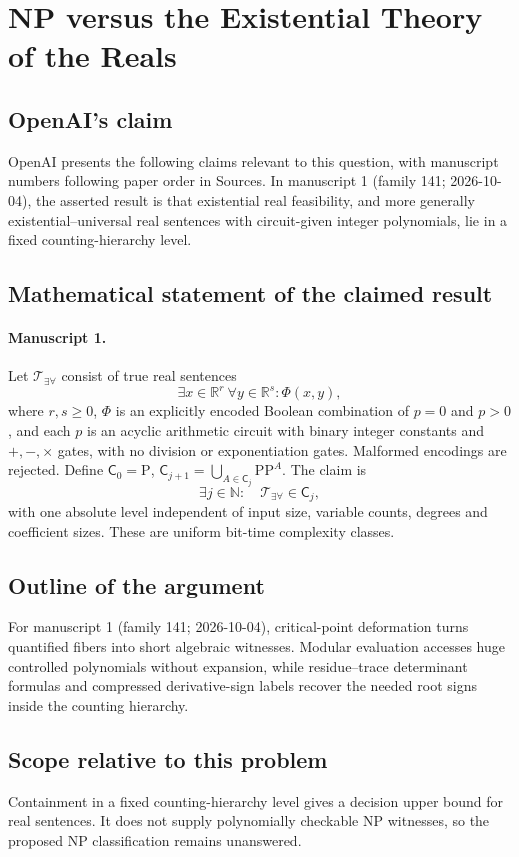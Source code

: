 \documentclass[11pt]{article}
\begin{document}
\section*{NP versus the Existential Theory of the Reals}

\subsection{OpenAI's claim}
OpenAI presents the following claims relevant to this question, with manuscript numbers following paper order in Sources. In manuscript 1 (family 141; 2026-10-04), the asserted result is that existential real feasibility, and more generally existential--universal real sentences with circuit-given integer polynomials, lie in a fixed counting-hierarchy level.

\subsection{Mathematical statement of the claimed result}
\paragraph{Manuscript 1.}
Let $\mathcal T_{\exists\forall}$ consist of true real sentences
\[
 \exists x\in\mathbb R^r\ \forall y\in\mathbb R^s:\Phi(x,y),
\]
where $r,s\ge0$, $\Phi$ is an explicitly encoded Boolean combination of $p=0$ and $p>0$, and each $p$ is an acyclic arithmetic circuit with binary integer constants and $+,-,\times$ gates, with no division or exponentiation gates. Malformed encodings are rejected. Define $\mathsf C_0=\mathrm P$, $\mathsf C_{j+1}=\bigcup_{A\in\mathsf C_j}\mathrm{PP}^A$. The claim is
\[
 \exists j\in\mathbb N:\quad\mathcal T_{\exists\forall}\in\mathsf C_j,
\]
with one absolute level independent of input size, variable counts, degrees and coefficient sizes. These are uniform bit-time complexity classes.

\subsection{Outline of the argument}
For manuscript 1 (family 141; 2026-10-04), critical-point deformation turns quantified fibers into short algebraic witnesses. Modular evaluation accesses huge controlled polynomials without expansion, while residue--trace determinant formulas and compressed derivative-sign labels recover the needed root signs inside the counting hierarchy.

\subsection{Scope relative to this problem}
Containment in a fixed counting-hierarchy level gives a decision upper bound for real sentences. It does not supply polynomially checkable NP witnesses, so the proposed NP classification remains unanswered.
\end{document}
